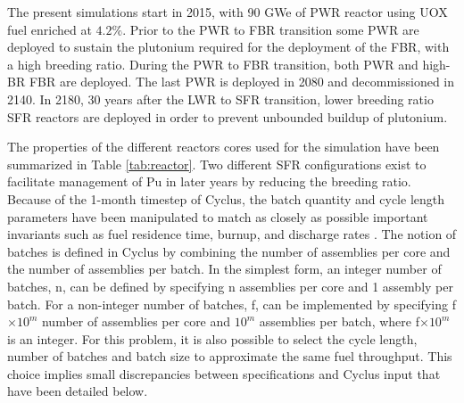 \documentclass[12pt]{article}
\begin{document}
The present simulations start in 2015, with 90 GWe of PWR reactor using UOX
fuel enriched at $4.2\%$. Prior to the PWR to FBR transition some PWR are
deployed to sustain the plutonium required for the deployment of the FBR, with a
high breeding ratio. During the PWR to FBR transition, both PWR and high-BR FBR
are deployed. The last PWR is deployed in 2080 and decommissioned in 2140. In
2180, 30 years after the LWR to SFR transition, lower breeding ratio SFR
reactors are deployed in order to prevent unbounded buildup of plutonium. 

The properties of the different reactors cores used for the simulation have been
summarized in Table \ref{tab:reactor}. Two different SFR configurations exist to
facilitate management of Pu in later years by reducing the breeding ratio.
Because of the 1-month timestep of Cyclus, the batch quantity and cycle length
parameters have been manipulated to match as closely as possible important
invariants such as fuel residence time, burnup, and discharge rates
\cite{B.Feng_calculation}. The notion of batches is defined in Cyclus by
combining the number of assemblies per core and the number of assemblies per
batch.  In the simplest form, an integer number of batches, n, can be defined by
specifying n assemblies per core and 1 assembly per batch.  For a non-integer
number of batches, f, can be implemented by specifying f$\times 10^m$ number of
assemblies per core and $10^m$ assemblies per batch, where f$\times 10^m$ is an
integer.  For this problem, it is also possible to select the cycle length,
number of batches and batch size to approximate the same fuel throughput.  This
choice implies small discrepancies between specifications and Cyclus input that
have been detailed below.
\end{document}
